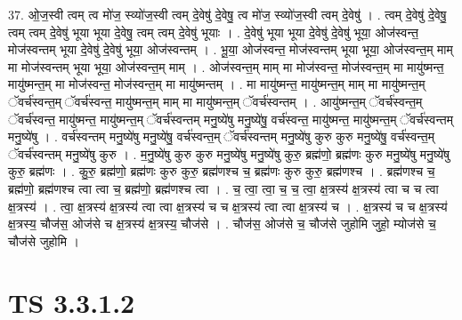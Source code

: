 \documentclass[17pt]{extarticle}
\begin{document}
37. ओ॒ज॒स्वी त्वम् त्व मो॑ज॒ स्व्यो॑ज॒स्वी त्वम् दे॒वेषु॑ दे॒वेषु॒ त्व मो॑ज॒ स्व्यो॑ज॒स्वी त्वम् दे॒वेषु॑ । . त्वम् दे॒वेषु॑ दे॒वेषु॒ त्वम् त्वम् दे॒वेषु॑ भूया भूया दे॒वेषु॒ त्वम् त्वम् दे॒वेषु॑ भूयाः । . दे॒वेषु॑ भूया भूया दे॒वेषु॑ दे॒वेषु॑ भूया॒ ओज॑स्वन्त॒ मोज॑स्वन्तम् भूया दे॒वेषु॑ दे॒वेषु॑ भूया॒ ओज॑स्वन्तम् । . भू॒या॒ ओज॑स्वन्त॒ मोज॑स्वन्तम् भूया भूया॒ ओज॑स्वन्त॒म् माम् मा मोज॑स्वन्तम् भूया भूया॒ ओज॑स्वन्त॒म् माम् । . ओज॑स्वन्त॒म् माम् मा मोज॑स्वन्त॒ मोज॑स्वन्त॒म् मा मायु॑ष्मन्त॒ मायु॑ष्मन्त॒म् मा मोज॑स्वन्त॒ मोज॑स्वन्त॒म् मा मायु॑ष्मन्तम् । . मा मायु॑ष्मन्त॒ मायु॑ष्मन्त॒म् माम् मा मायु॑ष्मन्त॒म् ॅवर्च॑स्वन्त॒म् ॅवर्च॑स्वन्त॒ मायु॑ष्मन्त॒म् माम् मा मायु॑ष्मन्त॒म् ॅवर्च॑स्वन्तम् । . आयु॑ष्मन्त॒म् ॅवर्च॑स्वन्त॒म् ॅवर्च॑स्वन्त॒ मायु॑ष्मन्त॒ मायु॑ष्मन्त॒म् ॅवर्च॑स्वन्तम् मनु॒ष्ये॑षु मनु॒ष्ये॑षु॒ वर्च॑स्वन्त॒ मायु॑ष्मन्त॒ मायु॑ष्मन्त॒म् ॅवर्च॑स्वन्तम् मनु॒ष्ये॑षु । . वर्च॑स्वन्तम् मनु॒ष्ये॑षु मनु॒ष्ये॑षु॒ वर्च॑स्वन्त॒म् ॅवर्च॑स्वन्तम् मनु॒ष्ये॑षु कुरु कुरु मनु॒ष्ये॑षु॒ वर्च॑स्वन्त॒म् ॅवर्च॑स्वन्तम् मनु॒ष्ये॑षु कुरु । . म॒नु॒ष्ये॑षु कुरु कुरु मनु॒ष्ये॑षु मनु॒ष्ये॑षु कुरु॒ ब्रह्म॑णो॒ ब्रह्म॑णः कुरु मनु॒ष्ये॑षु मनु॒ष्ये॑षु कुरु॒ ब्रह्म॑णः । . कु॒रु॒ ब्रह्म॑णो॒ ब्रह्म॑णः कुरु कुरु॒ ब्रह्म॑णश्च च॒ ब्रह्म॑णः कुरु कुरु॒ ब्रह्म॑णश्च । . ब्रह्म॑णश्च च॒ ब्रह्म॑णो॒ ब्रह्म॑णश्च त्वा त्वा च॒ ब्रह्म॑णो॒ ब्रह्म॑णश्च त्वा । . च॒ त्वा॒ त्वा॒ च॒ च॒ त्वा॒ क्ष॒त्रस्य॑ क्ष॒त्रस्य॑ त्वा च च त्वा क्ष॒त्रस्य॑ । . त्वा॒ क्ष॒त्रस्य॑ क्ष॒त्रस्य॑ त्वा त्वा क्ष॒त्रस्य॑ च च क्ष॒त्रस्य॑ त्वा त्वा क्ष॒त्रस्य॑ च । . क्ष॒त्रस्य॑ च च क्ष॒त्रस्य॑ क्ष॒त्रस्य॒ चौज॑स॒ ओज॑से च क्ष॒त्रस्य॑ क्ष॒त्रस्य॒ चौज॑से । . चौज॑स॒ ओज॑से च॒ चौज॑से जुहोमि जुहो॒ म्योज॑से च॒ चौज॑से जुहोमि । \newline
\pagebreak
{}

\section{ TS 3.3.1.2 }
\end{document}
